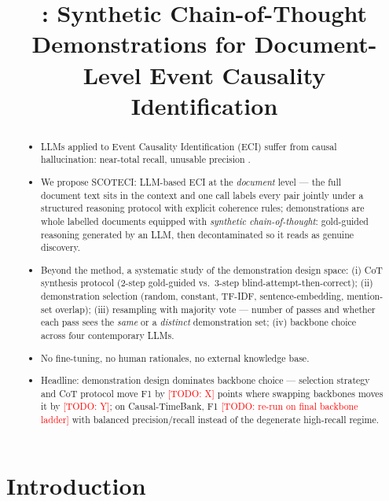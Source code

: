 \documentclass[11pt]{article}
\title{\method{}: Synthetic Chain-of-Thought Demonstrations for Document-Level Event Causality Identification\\
{\normalsize \todo{working title --- alternatives: ``What Matters in Document-Scale Few-Shot ECI?'' / ``Rationalize, Select, Resample: Demonstration Design for Document-Level ECI''}}}
\author{}
\date{}
\newcommand{\todo}[1]{\textcolor{red}{[TODO: #1]}}
\newcommand{\method}{SCOTECI}
\begin{document}
\maketitle

\begin{abstract}
\begin{itemize}
  \item LLMs applied to Event Causality Identification (ECI) suffer from causal
        hallucination: near-total recall, unusable precision \citep{gao2023chatgpt}.
  \item We propose \method{}: LLM-based ECI at the \emph{document} level --- the
        full document text sits in the context and one call labels every pair
        jointly under a structured reasoning protocol with explicit coherence
        rules; demonstrations are whole labelled documents equipped with
        \emph{synthetic chain-of-thought}: gold-guided reasoning generated by an
        LLM, then decontaminated so it reads as genuine discovery.
  \item Beyond the method, a systematic study of the demonstration design
        space: (i) CoT synthesis protocol (2-step gold-guided vs.\ 3-step
        blind-attempt-then-correct); (ii) demonstration selection (random,
        constant, TF-IDF, sentence-embedding, mention-set overlap);
        (iii) resampling with majority vote --- number of passes and whether
        each pass sees the \emph{same} or a \emph{distinct} demonstration set;
        (iv) backbone choice across four contemporary LLMs.
  \item No fine-tuning, no human rationales, no external knowledge base.
  \item Headline: demonstration design dominates backbone choice --- selection
        strategy and CoT protocol move F1 by \todo{X} points where swapping
        backbones moves it by \todo{Y}; on Causal-TimeBank, F1
        \todo{re-run on final backbone ladder} with balanced precision/recall
        instead of the degenerate high-recall regime.
\end{itemize}
\end{abstract}

\section{Introduction}
\label{sec:intro}
\end{document}
